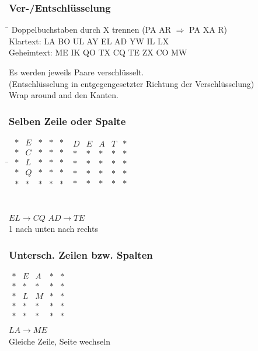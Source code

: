 \documentclass[10pt]{article}
\begin{document}
\subsubsection{Ver-/Entschlüsselung}
\begin{tabbing}
\hspace{16em} \= \kill
Doppelbuchstaben durch X trennen \> (PA AR $\Rightarrow$ PA XA R)\\
Klartext:  \>  LA BO UL AY EL AD YW IL LX \\
Geheimtext: \> ME IK QO TX CQ TE ZX CO MW \\
\end{tabbing}
Es werden jeweils Paare verschlüsselt.\\
(Entschlüsselung in entgegengesetzter Richtung der Verschlüsselung)\\
Wrap around and den Kanten.
\begin{multicols}{2}
\subsubsection*{Selben Zeile oder Spalte}
\begin{tabbing}
\hspace{10em} \= \kill
$\begin{matrix}
* & E & * & * & * \\
* & C & * & * & * \\
* & L & * & * & * \\
* & Q & * & * & * \\
* & * & * & * & * \\
\end{matrix}$ 
\>
$\begin{matrix}
D & E & A & T & * \\
* & * & * & * & * \\
* & * & * & * & * \\
* & * & * & * & * \\
* & * & * & * & * \\
\end{matrix}$

\\ 
$ EL \rightarrow CQ$\> $AD \rightarrow TE $ \\
1 nach unten nach rechts
\end{tabbing} 
\subsubsection*{Untersch. Zeilen bzw. Spalten}
$\begin{matrix}
* & E & A & * & * \\
* & * & * & * & * \\
* & L & M & * & * \\
* & * & * & * & * \\
* & * & * & * & * \\
\end{matrix}$\\
$LA \rightarrow ME$\\
Gleiche Zeile, Seite wechseln
\end{multicols}
\end{document}
